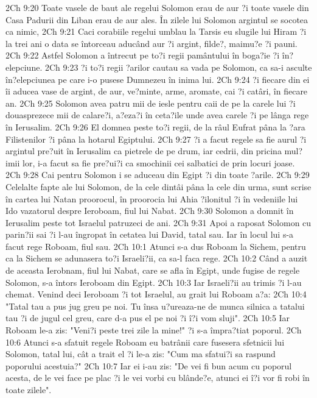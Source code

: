 2Ch 9:20  Toate vasele de baut ale regelui Solomon erau de aur ?i toate vasele din Casa Padurii din Liban erau de aur ales. În zilele lui Solomon argintul se socotea ca nimic,
2Ch 9:21  Caci corabiile regelui umblau la Tarsis eu slugile lui Hiram ?i la trei ani o data se întorceau aducând aur ?i argint, filde?, maimu?e ?i pauni.
2Ch 9:22  Astfel Solomon a întrecut pe to?i regii pamântului în boga?ie ?i în?elepciune.
2Ch 9:23  ?i to?i regii ?arilor cautau sa vada pe Solomon, ca sa-i asculte în?elepciunea pe care i-o pusese Dumnezeu în inima lui.
2Ch 9:24  ?i fiecare din ei îi aducea vase de argint, de aur, ve?minte, arme, aromate, cai ?i catâri, în fiecare an.
2Ch 9:25  Solomon avea patru mii de iesle pentru caii de pe la carele lui ?i douasprezece mii de calare?i, a?eza?i în ceta?ile unde avea carele ?i pe lânga rege în Ierusalim.
2Ch 9:26  El domnea peste to?i regii, de la râul Eufrat pâna la ?ara Filistenilor ?i pâna la hotarul Egiptului.
2Ch 9:27  ?i a facut regele sa fie aurul ?i argintul pre?uit în Ierusalim ca pietrele de pe drum, iar cedrii, din pricina mul?imii lor, i-a facut sa fie pre?ui?i ca smochinii cei salbatici de prin locuri joase.
2Ch 9:28  Cai pentru Solomon i se aduceau din Egipt ?i din toate ?arile.
2Ch 9:29  Celelalte fapte ale lui Solomon, de la cele dintâi pâna la cele din urma, sunt scrise în cartea lui Natan proorocul, în proorocia lui Ahia ?ilonitul ?i în vedeniile lui Ido vazatorul despre Ieroboam, fiul lui Nabat.
2Ch 9:30  Solomon a domnit în Ierusalim peste tot Israelul patruzeci de ani.
2Ch 9:31  Apoi a raposat Solomon cu parin?ii sai ?i l-au îngropat în cetatea lui David, tatal sau. Iar în locul lui s-a facut rege Roboam, fiul sau.
2Ch 10:1  Atunci s-a dus Roboam la Sichem, pentru ca la Sichem se adunasera to?i Israeli?ii, ca sa-l faca rege.
2Ch 10:2  Când a auzit de aceasta Ierobnam, fiul lui Nabat, care se afla în Egipt, unde fugise de regele Solomon, s-a întors Ieroboam din Egipt.
2Ch 10:3  Iar Israeli?ii au trimis ?i l-au chemat. Venind deci Ieroboam ?i tot Israelul, au grait lui Roboam a?a:
2Ch 10:4  "Tatal tau a pus jug greu pe noi. Tu însa u?ureaza-ne de munca silnica a tatalui tau ?i de jugul cel greu, care d-a pus el pe noi ?i î?i vom sluji".
2Ch 10:5  Iar Roboam le-a zis: "Veni?i peste trei zile la mine!" ?i s-a împra?tiat poporul.
2Ch 10:6  Atunci s-a sfatuit regele Roboam eu batrânii care fusesera sfetnicii lui Solomon, tatal lui, cât a trait el ?i le-a zis: "Cum ma sfatui?i sa raspund poporului acestuia?"
2Ch 10:7  Iar ei i-au zis: "De vei fi bun acum cu poporul acesta, de le vei face pe plac ?i le vei vorbi cu blânde?e, atunci ei î?i vor fi robi în toate zilele".
